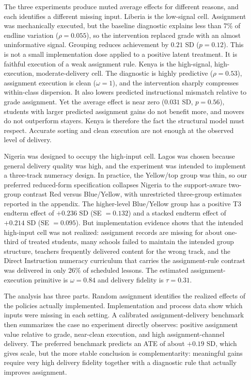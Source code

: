 \documentclass[11pt]{article}
\begin{document}
The three experiments produce muted average effects for different reasons, and each identifies a different missing input. Liberia is the low-signal cell. Assignment was mechanically executed, but the baseline diagnostic explains less than 7\% of endline variation ($\rho = 0.055$), so the intervention replaced grade with an almost uninformative signal. Grouping reduces achievement by $0.21$ SD ($p = 0.12$). This is not a small implementation dose applied to a positive latent treatment. It is faithful execution of a weak assignment rule. Kenya is the high-signal, high-execution, moderate-delivery cell. The diagnostic is highly predictive ($\rho = 0.53$), assignment execution is clean ($\omega = 1$), and the intervention sharply compresses within-class dispersion. It also lowers predicted instructional mismatch relative to grade assignment. Yet the average effect is near zero ($0.031$ SD, $p = 0.56$), students with larger predicted assignment gains do not benefit more, and movers do not outperform stayers. Kenya is therefore the fact the structural model must respect. Accurate sorting and clean execution are not enough at the observed level of delivery.

Nigeria was designed to occupy the high-input cell. Lagos was chosen because general delivery quality was high, and the experiment was intended to implement a three-track numeracy design. In practice, the Yellow/top group was thin, so our preferred reduced-form specification collapses Nigeria to the support-aware two-group contrast Red versus Blue/Yellow, with unrestricted three-group estimates reported in the appendix. The higher-level Blue/Yellow group has a positive T3 endterm effect of $+0.236$ SD (SE $=0.132$) and a stacked endterm effect of $+0.214$ SD (SE $=0.095$). But implementation evidence shows that the intended high-input cell was not realized: assignment records are missing for about one-third of treated students, many schools failed to maintain the intended group structure, teachers frequently delivered content for the wrong track, and the Direct Instruction numeracy curriculum that carries the assignment-rule contrast was delivered in only 26\% of scheduled lessons. The estimated assignment-execution primitive is $\omega=0.84$ and delivery fidelity is $\tau=0.31$.

The analysis has three parts. Random assignment identifies the realized effects of the policies actually implemented. Implementation and process data show which inputs were missing in each setting. A calibrated assignment-delivery benchmark then summarizes the case no experiment directly observes: positive assignment value relative to grade, near-clean execution, and high assignment-channel delivery. The preferred benchmark predicts an ATE of about $+0.19$ SD, which gives scale, but the more stable conclusion is complementarity: meaningful gains require very high delivery fidelity together with a diagnostic rule that actually improves assignment.
\end{document}
